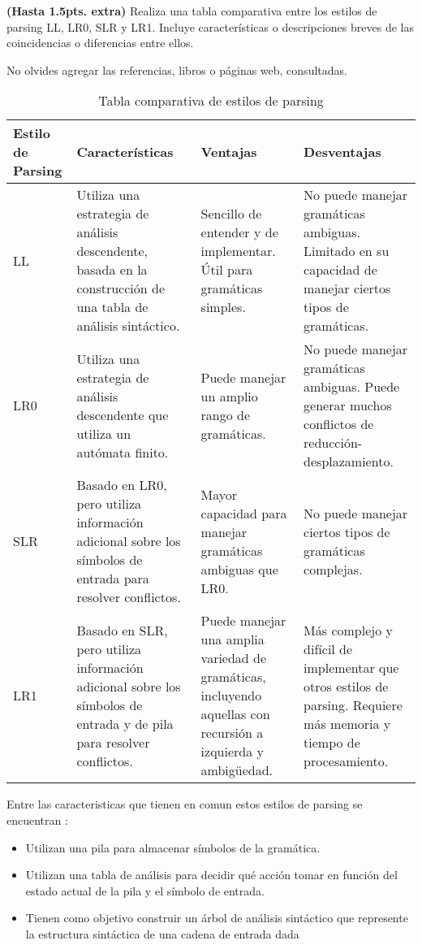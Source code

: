 
\textbf{(Hasta 1.5pts. extra)} Realiza una tabla comparativa entre los estilos
de parsing LL, LR0, SLR y LR1. Incluye caracter\'isticas o descripciones breves
de las coincidencias o diferencias entre ellos. \newline

No olvides agregar las referencias, libros o p\'aginas web, consultadas.


\begin{table}[h]
    \centering
    \caption{Tabla comparativa de estilos de parsing}
    \label{tab:comparativa-parsing}
    \begin{tabular}{|l|p{5cm}|p{4cm}|p{4cm}|}
        \hline
        \textbf{Estilo de Parsing} & \textbf{Características} & \textbf{Ventajas} & \textbf{Desventajas} \\
        \hline
        LL & Utiliza una estrategia de análisis descendente, basada en la construcción de una tabla de análisis sintáctico.
        & Sencillo de entender y de implementar. Útil para gramáticas simples. & No puede manejar gramáticas ambiguas.
        Limitado en su capacidad de manejar ciertos tipos de gramáticas. \\
        \hline
        LR0 & Utiliza una estrategia de análisis descendente que utiliza un autómata finito. & Puede manejar un amplio rango de gramáticas. & No puede manejar gramáticas ambiguas. Puede generar muchos conflictos de reducción-desplazamiento. \\
        \hline
        SLR & Basado en LR0, pero utiliza información adicional sobre los símbolos de entrada para resolver conflictos. & Mayor capacidad para manejar gramáticas ambiguas que LR0. & No puede manejar ciertos tipos de gramáticas complejas. \\
        \hline
        LR1 & Basado en SLR, pero utiliza información adicional sobre los símbolos de entrada y de pila para resolver conflictos. & Puede manejar una amplia variedad de gramáticas, incluyendo aquellas con recursión a izquierda y ambigüedad. & Más complejo y difícil de implementar que otros estilos de parsing. Requiere más memoria y tiempo de procesamiento. \\
        \hline
    \end{tabular}
\end{table}

    Entre las caracteristicas que tienen en comun estos estilos de parsing se encuentran :

\begin{itemize}
    \item Utilizan una pila para almacenar símbolos de la gramática.\\
    \item Utilizan una tabla de análisis para decidir qué acción tomar en función del estado actual de la pila y el símbolo de entrada.\\
    \item Tienen como objetivo construir un árbol de análisis sintáctico que represente la estructura sintáctica de una cadena de entrada dada\\
\end{itemize}

